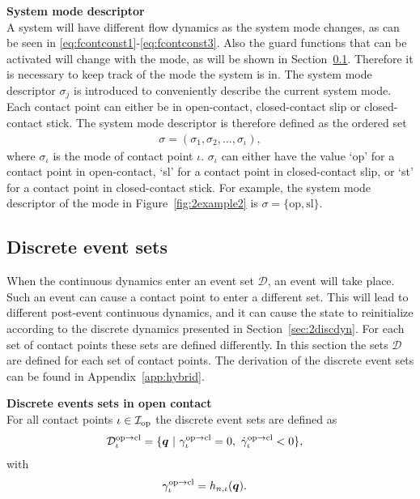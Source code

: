\documentclass[../DC2017114Bouma.tex]{subfiles}
\begin{document}
\textbf{System mode descriptor}\\
A system will have different flow dynamics as the system mode changes, as can be seen in \eqref{eq:fcontconst1}-\eqref{eq:fcontconst3}. Also the guard functions that can be activated will change with the mode, as will be shown in Section~\ref{sec:2event}. Therefore it is necessary to keep track of the mode the system is in. The system mode descriptor $\sigma_j$ is introduced to conveniently describe the current system mode. Each contact point can either be in open-contact, closed-contact slip or closed-contact stick. The system mode descriptor is therefore defined as the ordered set
\begin{align}
\sigma = (\sigma_1,\sigma_2,...,\sigma_\iota),
\end{align}
where $\sigma_\iota$ is the mode of contact point $\iota$. $\sigma_\iota$ can either have the value `op' for a contact point in open-contact, `sl' for a contact point in closed-contact slip, or `st' for a contact point in closed-contact stick. For example, the system mode descriptor of the mode in Figure~\ref{fig:2example2} is $\sigma = \{\text{op},\text{sl}\}$.

\subsection{Discrete event sets}\label{sec:2event}
When the continuous dynamics enter an event set $\mathcal{D}$, an event will take place. Such an event can cause a contact point to enter a different set. This will lead to different post-event continuous dynamics, and it can cause the state to reinitialize according to the discrete dynamics presented in Section~\ref{sec:2discdyn}. For each set of contact points these sets are defined differently. In this section the sets $\mathcal{D}$ are defined for each set of contact points. The derivation of the discrete event sets can be found in Appendix~\ref{app:hybrid}.

\textbf{Discrete events sets in open contact}\\
For all contact points $\iota\in\mathcal{I}_{\text{op}}$ the discrete event sets are defined as
\begin{align}
\mathcal{D}^{\text{op}\rightarrow\text{cl}}_{\iota} &= \{ \qb\ |\ \gamma^{\text{op}\rightarrow\text{cl}}_{\iota} = 0,\ \dot{\gamma}^{\text{op}\rightarrow\text{cl}}_{\iota} < 0 \},\label{eq:2Dopcl}
\end{align}
%
with
\begin{align}
\gamma^{\text{op}\rightarrow\text{cl}}_{\iota} &= h_{n,\iota}({\boldsymbol{q}}).
\end{align}
\end{document}
